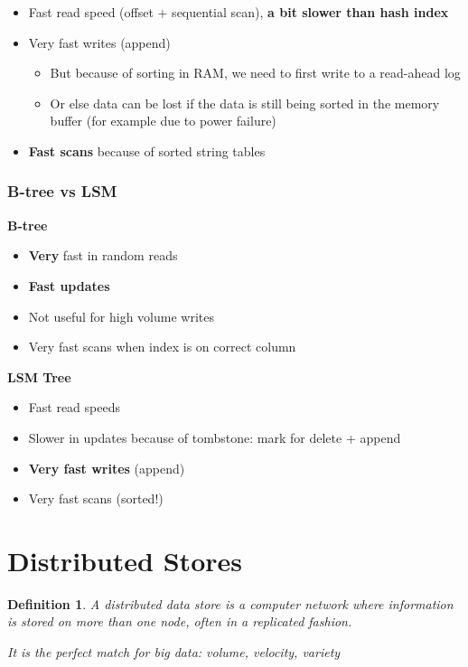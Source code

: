 \documentclass{article}
\newtheorem{theorem}{Definition}[section]
\begin{document}
\begin{itemize}
    \item Fast read speed (offset + sequential scan), \textbf{a bit slower than hash index}
    \item Very fast writes (append)
    \begin{itemize}
        \item But because of sorting in RAM, we need to first write to a read-ahead log
        \item Or else data can be lost if the data is still being sorted in the memory buffer (for example due to power failure)
    \end{itemize}
    \item \textbf{Fast scans} because of sorted string tables
\end{itemize}

\subsubsection{B-tree vs LSM}

\textbf{B-tree}

\begin{itemize}
    \item \textbf{Very} fast in random reads
    \item \textbf{Fast updates}
    \item Not useful for high volume writes
    \item Very fast scans when index is on correct column
\end{itemize}

\textbf{LSM Tree}

\begin{itemize}
    \item Fast read speeds
    \item Slower in updates because of tombstone: mark for delete + append
    \item \textbf{Very fast writes} (append)
    \item Very fast scans (sorted!)
\end{itemize}

\section{Distributed Stores}

\begin{theorem}
    A distributed data store is a computer network where information is stored on 
    more than one node, often in a replicated fashion.

    It is the perfect match for big data: volume, velocity, variety
\end{theorem}
\end{document}
